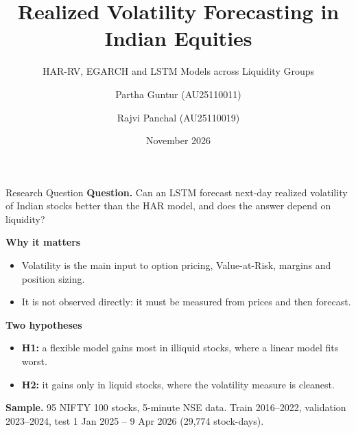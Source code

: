 \documentclass[aspectratio=169, 10pt]{beamer}
\title{Realized Volatility Forecasting in Indian Equities}
\subtitle{HAR-RV, EGARCH and LSTM Models across Liquidity Groups}
\author{Partha Guntur (AU25110011) \and Rajvi Panchal (AU25110019)}
\institute{M.Sc. Quantitative Finance, Ahmedabad University}
\date{November 2026}
\begin{document}
\begin{frame}[plain]
    \titlepage
\end{frame}

\begin{frame}{Research Question}
    \textbf{Question.} Can an LSTM forecast next-day realized volatility of Indian stocks better
    than the HAR model, and does the answer depend on liquidity?

    \vspace{0.4cm}
    \textbf{Why it matters}
    \begin{itemize}
        \item Volatility is the main input to option pricing, Value-at-Risk, margins and position sizing.
        \item It is not observed directly: it must be measured from prices and then forecast.
    \end{itemize}

    \vspace{0.3cm}
    \textbf{Two hypotheses}
    \begin{itemize}
        \item \textbf{H1:} a flexible model gains most in illiquid stocks, where a linear model fits worst.
        \item \textbf{H2:} it gains only in liquid stocks, where the volatility measure is cleanest.
    \end{itemize}

    \vspace{0.3cm}
    \textbf{Sample.} 95 NIFTY 100 stocks, 5-minute NSE data. Train 2016--2022, validation 2023--2024,
    test 1 Jan 2025 -- 9 Apr 2026 (29,774 stock-days).
\end{frame}
\end{document}
